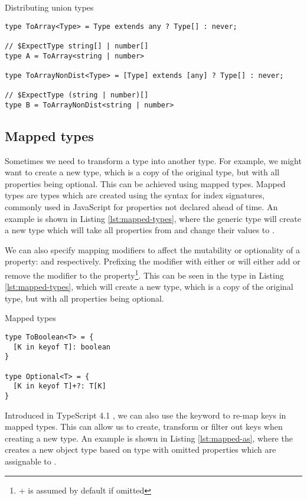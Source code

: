 \begin{listing}[ht]
  \caption{Distributing union types}\label{lst:distribute}
  \begin{verbatim}
type ToArray<Type> = Type extends any ? Type[] : never;

// $ExpectType string[] | number[]
type A = ToArray<string | number> 

type ToArrayNonDist<Type> = [Type] extends [any] ? Type[] : never;

// $ExpectType (string | number)[]
type B = ToArrayNonDist<string | number> 
\end{verbatim}
\end{listing}

\subsection{Mapped types}

Sometimes we need to transform a type into another type. For example, we might want to create a new type, which is a copy of the original type, but with all properties being optional. This can be achieved using mapped types. Mapped types are types which are created using the syntax for index signatures, commonly used in JavaScript for properties not declared ahead of time. An example is shown in Listing \ref{lst:mapped-types}, where the generic type  will create a new type which will take all properties from  and change their values to .

We can also specify mapping modifiers to affect the mutability or optionality of a property:  and  respectively. Prefixing the modifier with either \code{+} or \code{-} will either add or remove the modifier to the property\footnote{+ is assumed by default if omitted}. This can be seen in the  type in Listing \ref{lst:mapped-types}, which will create a new type, which is a copy of the original type, but with all properties being optional.

\begin{listing}[ht]
  \caption{Mapped types}\label{lst:mapped-types}
  \begin{verbatim}
type ToBoolean<T> = {
  [K in keyof T]: boolean
}

type Optional<T> = {
  [K in keyof T]+?: T[K]
}
\end{verbatim}
\end{listing}

Introduced in TypeScript 4.1 \cite{AnnouncingTypeScript4.1}, we can also use the  keyword to re-map keys in mapped types. This can allow us to create, transform or filter out keys when creating a new type. An example is shown in Listing \ref{lst:mapped-as}, where the  creates a new object type based on type  with omitted properties which are assignable to .

